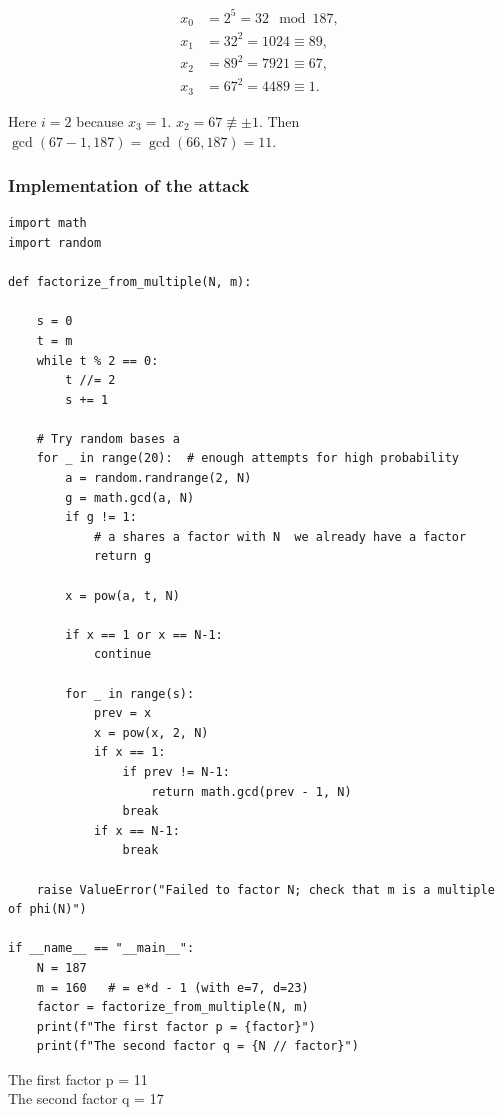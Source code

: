 \begin{align*}
x_0 &= 2^5 = 32 \mod 187,\\
x_1 &= 32^2 = 1024 \equiv 89,\\
x_2 &= 89^2 = 7921 \equiv 67,\\
x_3 &= 67^2 = 4489 \equiv 1.
\end{align*}

Here \(i=2\) because \(x_3=1\). \(x_2 = 67 \not\equiv \pm 1\). Then \(\gcd(67-1,187) = \gcd(66,187) = 11\).

\subsubsection*{Implementation of the attack}

\begin{lstlisting}[style=pythonstyle,label=lst:simmons]
import math
import random

def factorize_from_multiple(N, m):

    s = 0
    t = m
    while t % 2 == 0:
        t //= 2
        s += 1

    # Try random bases a
    for _ in range(20):  # enough attempts for high probability
        a = random.randrange(2, N)
        g = math.gcd(a, N)
        if g != 1:
            # a shares a factor with N  we already have a factor
            return g

        x = pow(a, t, N)

        if x == 1 or x == N-1:
            continue

        for _ in range(s):
            prev = x
            x = pow(x, 2, N)
            if x == 1:
                if prev != N-1:
                    return math.gcd(prev - 1, N)
                break
            if x == N-1:
                break

    raise ValueError("Failed to factor N; check that m is a multiple of phi(N)")

if __name__ == "__main__":
    N = 187
    m = 160   # = e*d - 1 (with e=7, d=23)
    factor = factorize_from_multiple(N, m)
    print(f"The first factor p = {factor}")
    print(f"The second factor q = {N // factor}")
\end{lstlisting}

\begin{tcolorbox}[colback=gray!10, colframe=gray!40, arc=2mm, boxrule=0.5pt]
\ttfamily
The first factor p = 11 \\
The second factor q = 17
\end{tcolorbox}
\vspace{1em}


